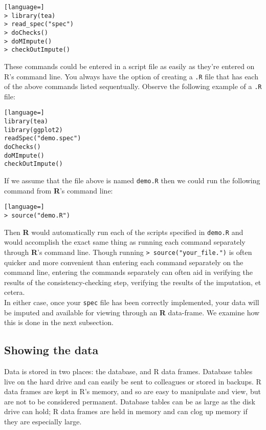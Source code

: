 \documentclass{article}
\begin{document}
\begin{lstlisting}[language=]
> library(tea)
> read_spec("spec")
> doChecks()
> doMImpute()
> checkOutImpute()
\end{lstlisting}

These commands could be entered in a script file as easily as they're entered on R's command line.
You always have the option of creating a {\tt .R} file that has each of the above commands listed 
sequentually. Observe the following example of a {\tt .R} file:

\begin{lstlisting}[language=]
library(tea)
library(ggplot2)
readSpec("demo.spec")
doChecks()
doMImpute()
checkOutImpute()
\end{lstlisting}

If we assume that the file above is named {\tt demo.R} then we could run the following command 
from \textbf{R}'s command line:

\begin{lstlisting}[language=]
> source("demo.R")
\end{lstlisting}

Then \textbf{R} would automatically run each of the scripts specified in {\tt demo.R} and would 
accomplish the exact same thing as running each command separately through \textbf{R}'s command line.
Though running {\tt > source("your\_file.")} is often quicker and more convenient than entering 
each command separately on the command line, entering the commands separately can often aid in 
verifying the results of the consistency-checking step, verifying the results of the imputation, 
et cetera.\\

In either case, once your {\tt spec} file has been correctly implemented, your data will be 
imputed and available for viewing through an \textbf{R} data-frame.
We examine how this is done in the next subsection.

\subsection{Showing the data}
Data is stored in two places: the database, and R data frames. Database tables
live on the hard drive and can easily be sent to colleagues or stored in
backups. R data frames are kept in R's memory, and so are easy to manipulate and
view, but are not to be considered permanent. Database tables can be as large as
the disk drive can hold; R data frames are held in memory and can clog up memory if
they are especially large.
\end{document}
